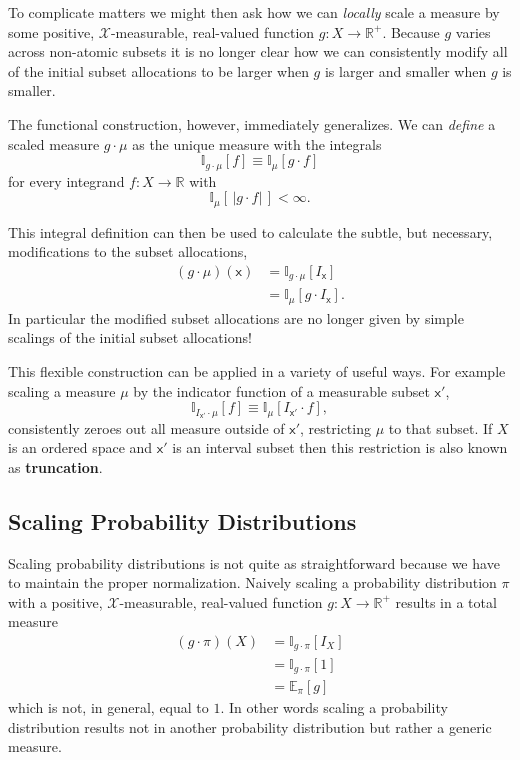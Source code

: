 \documentclass[
  letterpaper,
  DIV=11,
  numbers=noendperiod]{scrartcl}
\begin{document}
To complicate matters we might then ask how we can \emph{locally} scale
a measure by some positive, \(\mathcal{X}\)-measurable, real-valued
function \(g: X \rightarrow \mathbb{R}^{+}\). Because \(g\) varies
across non-atomic subsets it is no longer clear how we can consistently
modify all of the initial subset allocations to be larger when \(g\) is
larger and smaller when \(g\) is smaller.

The functional construction, however, immediately generalizes. We can
\emph{define} a scaled measure \(g \cdot \mu\) as the unique measure
with the integrals \[
\mathbb{I}_{g \cdot \mu} [ f ] \equiv \mathbb{I}_{\mu} [ g \cdot f ]
\] for every integrand \(f: X \rightarrow \mathbb{R}\) with \[
\mathbb{I}_{\mu} [ \, | g \cdot f | \, ] < \infty.
\]

This integral definition can then be used to calculate the subtle, but
necessary, modifications to the subset allocations, \begin{align*}
(g \cdot \mu)(\mathsf{x})
&=
\mathbb{I}_{g \cdot \mu} [ I_{\mathsf{x}} ]
\\
&=
\mathbb{I}_{\mu} [ g \cdot I_{\mathsf{x}} ].
\end{align*} In particular the modified subset allocations are no longer
given by simple scalings of the initial subset allocations!

This flexible construction can be applied in a variety of useful ways.
For example scaling a measure \(\mu\) by the indicator function of a
measurable subset \(\mathsf{x}'\), \[
\mathbb{I}_{I_{\mathsf{x}'} \cdot \mu} [ f ]
\equiv
\mathbb{I}_{\mu} [ I_{\mathsf{x}'} \cdot f ],
\] consistently zeroes out all measure outside of \(\mathsf{x}'\),
restricting \(\mu\) to that subset. If \(X\) is an ordered space and
\(\mathsf{x}'\) is an interval subset then this restriction is also
known as \textbf{truncation}.

\hypertarget{scaling-probability-distributions}{%
\subsection{Scaling Probability
Distributions}\label{scaling-probability-distributions}}

Scaling probability distributions is not quite as straightforward
because we have to maintain the proper normalization. Naively scaling a
probability distribution \(\pi\) with a positive,
\(\mathcal{X}\)-measurable, real-valued function
\(g : X \rightarrow \mathbb{R}^{+}\) results in a total measure
\begin{align*}
(g \cdot \pi)(X)
&=
\mathbb{I}_{g \cdot \pi} [ I_{X} ]
\\
&=
\mathbb{I}_{g \cdot \pi} [ 1 ]
\\
&=
\mathbb{E}_{\pi} [ g ]
\end{align*} which is not, in general, equal to \(1\). In other words
scaling a probability distribution results not in another probability
distribution but rather a generic measure.
\end{document}
